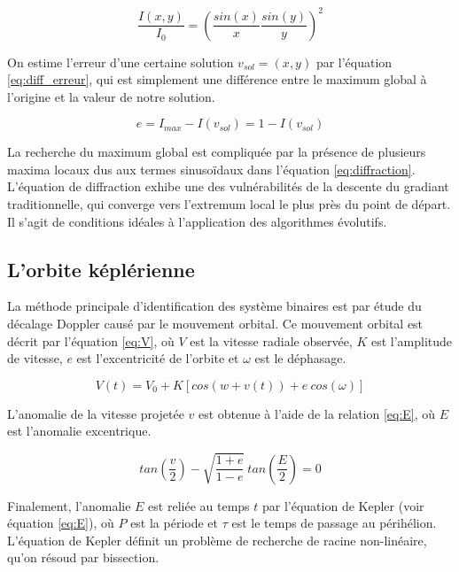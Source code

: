 \documentclass{article}
\begin{document}
\begin{equation}\label{eq:diffraction}
	\frac{I(x,y)}{I_0} = \left(\frac{sin(x)}{x}\frac{sin(y)}{y}\right)^2
\end{equation}

On estime l'erreur d'une certaine solution $v_{sol}=(x, y)$ par l'équation \ref{eq:diff_erreur}, qui est simplement une différence entre le maximum global à l'origine et la valeur de notre solution.

\begin{equation}\label{eq:diff_erreur}
e = I_{max} - I(v_{sol}) = 1 - I(v_{sol})
\end{equation}

La recherche du maximum global est compliquée par la présence de plusieurs maxima locaux dus aux termes sinusoïdaux dans l'équation \ref{eq:diffraction}. L'équation de diffraction exhibe une des vulnérabilités de la descente du gradiant traditionnelle, qui converge vers l'extremum local le plus près du point de départ. Il s'agit de conditions idéales à l'application des algorithmes évolutifs.

\subsection{L'orbite képlérienne}

La méthode principale d'identification des système binaires est par étude du décalage Doppler causé par le mouvement orbital.
Ce mouvement orbital est décrit par l'équation \ref{eq:V}, où $V$ est la vitesse radiale observée, $K$ est l'amplitude de vitesse, $e$ est l'excentricité de l'orbite et $\omega$ est le déphasage. 

\begin{equation}\label{eq:V}
	V(t) = V_0 + K[cos(w+v(t)) + e\ cos(\omega)]
\end{equation}

L'anomalie de la vitesse projetée $v$ est obtenue à l'aide de la relation \ref{eq:E}, où $E$ est l'anomalie excentrique. 

\begin{equation}\label{eq:v}
	tan \left(\frac{v}{2}\right) - \sqrt{\frac{1+e}{1-e}}\ tan\left(\frac{E}{2}\right) = 0
\end{equation}

Finalement, l'anomalie $E$ est reliée au temps $t$ par l'équation de Kepler (voir équation \ref{eq:E}), où $P$ est la période et $\tau$ est le temps de passage au périhélion. L'équation de Kepler définit un problème de recherche de racine non-linéaire, qu'on résoud par bissection.
\end{document}
